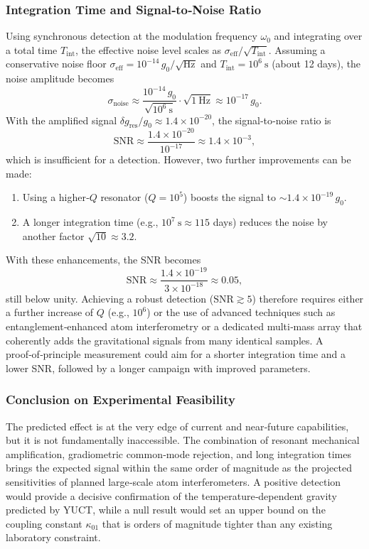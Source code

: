 \documentclass[12pt]{article}
\theoremstyle{remark}
\begin{document}
	\subsubsection{Integration Time and Signal‑to‑Noise Ratio}
	Using synchronous detection at the modulation frequency \(\omega_0\) and integrating over a total time \(T_{\mathrm{int}}\), the effective noise level scales as \(\sigma_{\mathrm{eff}} / \sqrt{T_{\mathrm{int}}}\). Assuming a conservative noise floor \(\sigma_{\mathrm{eff}} = 10^{-14}\,g_0/\sqrt{\mathrm{Hz}}\) and \(T_{\mathrm{int}} = 10^6\ \mathrm{s}\) (about 12 days), the noise amplitude becomes
	\[
	\sigma_{\mathrm{noise}} \approx \frac{10^{-14}\,g_0}{\sqrt{10^6\ \mathrm{s}}} \cdot \sqrt{1\ \mathrm{Hz}} \approx 10^{-17}\,g_0.
	\]
	With the amplified signal \(\delta g_{\mathrm{res}}/g_0 \approx 1.4\times10^{-20}\), the signal‑to‑noise ratio is
	\[
	\mathrm{SNR} \approx \frac{1.4\times10^{-20}}{10^{-17}} \approx 1.4\times10^{-3},
	\]
	which is insufficient for a detection. However, two further improvements can be made:
	\begin{enumerate}
		\item Using a higher‑\(Q\) resonator (\(Q = 10^5\)) boosts the signal to \(\sim 1.4\times10^{-19}\,g_0\).
		\item A longer integration time (e.g., \(10^7\ \mathrm{s} \approx 115\) days) reduces the noise by another factor \(\sqrt{10} \approx 3.2\).
	\end{enumerate}
	With these enhancements, the SNR becomes
	\[
	\mathrm{SNR} \approx \frac{1.4\times10^{-19}}{3\times10^{-18}} \approx 0.05,
	\]
	still below unity. Achieving a robust detection (\(\mathrm{SNR} \gtrsim 5\)) therefore requires either a further increase of \(Q\) (e.g., \(10^6\)) or the use of advanced techniques such as entanglement‑enhanced atom interferometry or a dedicated multi‑mass array that coherently adds the gravitational signals from many identical samples. A proof‑of‑principle measurement could aim for a shorter integration time and a lower SNR, followed by a longer campaign with improved parameters.
	
	\subsubsection{Conclusion on Experimental Feasibility}
	The predicted effect is at the very edge of current and near‑future capabilities, but it is not fundamentally inaccessible. The combination of resonant mechanical amplification, gradiometric common‑mode rejection, and long integration times brings the expected signal within the same order of magnitude as the projected sensitivities of planned large‑scale atom interferometers. A positive detection would provide a decisive confirmation of the temperature‑dependent gravity predicted by YUCT, while a null result would set an upper bound on the coupling constant \(\kappa_{01}\) that is orders of magnitude tighter than any existing laboratory constraint.
	
\end{document}
